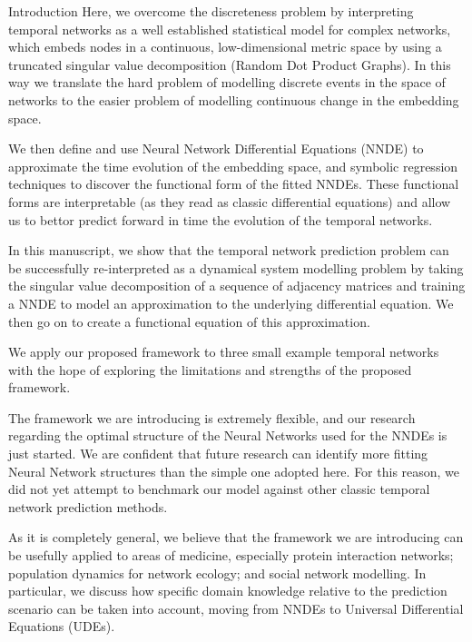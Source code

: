 \documentclass[12pt]{amsbook}
\begin{document}
\begin{chapter}{Introduction}
    Here, we overcome the discreteness problem by interpreting temporal networks as a well established statistical model for complex networks, which embeds nodes in a continuous, low-dimensional metric space by using a truncated singular value decomposition (Random Dot Product Graphs\cite{athreya2017statistical}). In this way we translate the hard problem of modelling discrete events in the space of networks to the easier problem of modelling continuous change in the embedding space. 
    
    We then define and use Neural Network Differential Equations (NNDE)\cite{SciML_C_Rak} to approximate the time evolution of the embedding space, and symbolic regression techniques to discover the functional form of the fitted NNDEs. These functional forms are interpretable (as they read as classic differential equations) and allow us to bettor predict forward in time the evolution of the temporal networks.

    In this manuscript, we show that the temporal network prediction problem can be successfully re-interpreted as a dynamical system modelling problem by taking the singular value decomposition of a sequence of adjacency matrices and training a NNDE to model an approximation to the underlying differential equation. We then go on to create a functional equation of this approximation. 

    We apply our proposed framework to three small example temporal networks with the hope of exploring the limitations and strengths of the proposed framework. 

    The framework we are introducing is extremely flexible, and our research regarding the optimal structure of the Neural Networks used for the NNDEs is just started.
    We are confident that future research can identify more fitting Neural Network structures than the simple one adopted here.
    For this reason, we did not yet attempt to benchmark our model against other classic temporal network prediction methods.

    As it is completely general, we believe that the framework we are introducing can be usefully applied to areas of medicine, especially protein interaction networks; population dynamics for network ecology; and social network modelling. In particular, we discuss how specific domain knowledge relative to the prediction scenario can be taken into account, moving from NNDEs to Universal Differential Equations (UDEs).
\end{chapter}
\end{document}
